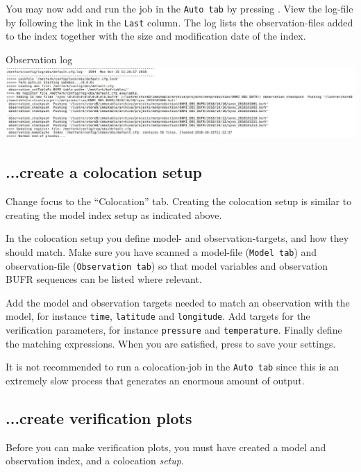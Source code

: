 \documentclass[letterpaper,10pt,twoside,twocolumn,openany]{book}
\begin{document}
{You may now add and run the job in the \lstinline!Auto tab! by pressing . View the log-file by following the link in  the \lstinline!Last! column. The log lists the observation-files added to the index together with the size and modification date of the index.
\begin{paperbox}{Observation log}
  \includegraphics[width=\columnwidth]{obslog.jpg}
\end{paperbox}

\subsection{...create a colocation setup}
Change focus to the ``Colocation'' tab. 
Creating the colocation setup is similar to creating the model index setup as indicated above.

In the colocation setup you define model- and observation-targets, and how they should match.
Make sure you have scanned a model-file (\lstinline!Model tab!)
and observation-file  (\lstinline!Observation tab!)
so that model variables and observation BUFR sequences can be listed where relevant.

Add the model and observation targets needed to match an observation with the model, for instance
\lstinline!time!, \lstinline!latitude! and \lstinline!longitude!.
Add targets for the verification parameters, for instance \lstinline!pressure! and \lstinline!temperature!. Finally define the matching expressions.
When you are satisfied, press  to save your settings.

It is not recommended to run a colocation-job in the \lstinline!Auto tab! since this is an extremely slow process that generates an enormous amount of output.

\subsection{...create verification plots}
Before you can make verification plots, you must have
created a model and observation index, and a colocation {\em setup}.

}
\end{document}
